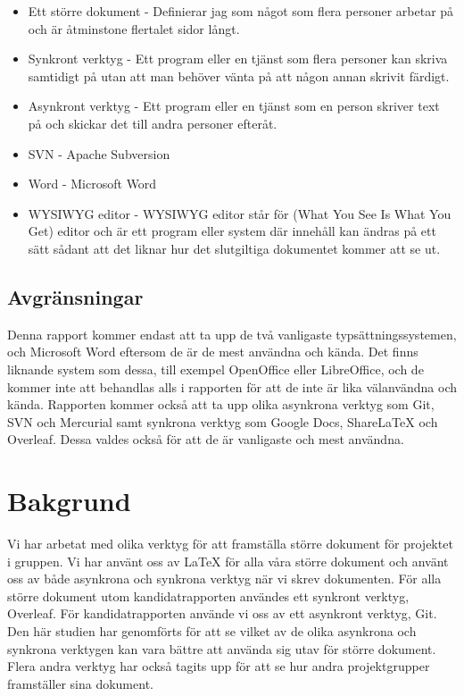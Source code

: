 \begin{itemize}
	\item Ett större dokument - Definierar jag som något som flera personer arbetar på och är åtminstone flertalet sidor långt.
	\item Synkront verktyg - Ett program eller en tjänst som flera personer kan skriva samtidigt på utan att man behöver vänta på att någon annan skrivit färdigt.
	\item Asynkront verktyg - Ett program eller en tjänst som en person skriver text på och skickar det till andra personer efteråt.
	\item SVN - Apache Subversion
	\item Word - Microsoft Word
	\item WYSIWYG editor - WYSIWYG editor står för (What You See Is What You Get) editor och är ett program eller system där innehåll kan ändras på ett sätt sådant att det liknar hur det slutgiltiga dokumentet kommer att se ut.
\end{itemize}

\subsection{Avgränsningar}
Denna rapport kommer endast att ta upp de två vanligaste typsättningssystemen, \latex och Microsoft Word eftersom de är de mest användna och kända. Det finns liknande system som dessa, till exempel OpenOffice eller LibreOffice, och de kommer inte att behandlas alls i rapporten för att de inte är lika välanvändna och kända. Rapporten kommer också att ta upp olika asynkrona verktyg som Git, SVN och Mercurial samt synkrona verktyg som Google Docs, ShareLaTeX och Overleaf. Dessa valdes också för att de är vanligaste och mest användna.

\section{Bakgrund}
\label{sec:background-tuhkala}
Vi har arbetat med olika verktyg för att framställa större dokument för projektet i gruppen. Vi har använt oss av LaTeX för alla våra större dokument och använt oss av både asynkrona och synkrona verktyg när vi skrev dokumenten. För alla större dokument utom kandidatrapporten användes ett synkront verktyg, Overleaf. För kandidatrapporten använde vi oss av ett asynkront verktyg, Git. Den här studien har genomförts för att se vilket av de olika asynkrona och synkrona verktygen kan vara bättre att använda sig utav för större dokument. Flera andra verktyg har också tagits upp för att se hur andra projektgrupper framställer sina dokument. 

